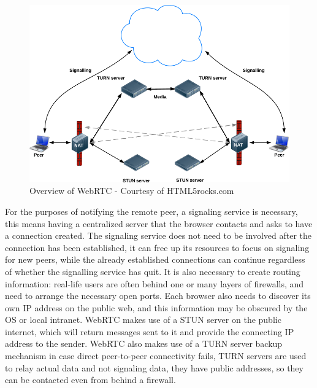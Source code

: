 \begin{figure}[H]
	\centering
	\includegraphics[scale=0.4]{gfx/webrtc-connect}
	\caption{Overview of WebRTC - Courtesy of HTML5rocks.com}
	\label{fig:webrtc-connect}
\end{figure}

For the purposes of notifying the remote peer, a signaling service is necessary,
this means having a centralized server that the browser contacts and asks to have a connection created.
The signaling service does not need to be involved after the connection has been established,
it can free up its resources to focus on signaling for new peers, 
while the already established connections can continue regardless of whether the signalling service has quit.
It is also necessary to create routing information:
real-life users are often behind one or many layers of firewalls, 
and need to arrange the necessary open ports.
Each browser also needs to discover its own IP address on the public web, 
and this information may be obscured by the OS or local intranet.
WebRTC makes use of a STUN server on the public internet, 
which will return messages sent to it and provide the connecting IP address to the sender.
WebRTC also makes use of a TURN server backup mechanism in case direct peer-to-peer connectivity fails,
TURN servers are used to relay actual data and not signaling data, they have public addresses, 
so they can be contacted even from behind a firewall.
